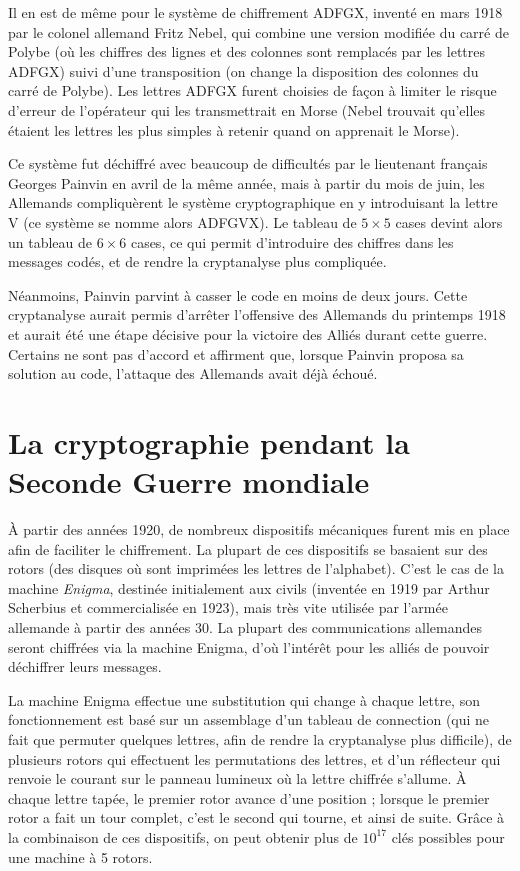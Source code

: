 Il en est de même pour le système de chiffrement ADFGX, inventé en
mars 1918 par le colonel allemand Fritz %
Nebel, qui combine une version modifiée
du carré de Polybe (où les chiffres des
lignes et des colonnes sont remplacés par les lettres ADFGX) suivi d'une
transposition (on change la disposition
des colonnes du carré de Polybe). Les lettres ADFGX furent choisies de
façon à limiter le risque d'erreur de l'opérateur qui les
transmettrait en Morse (Nebel trouvait qu'elles étaient les lettres
les plus simples à retenir quand on apprenait le Morse).

Ce système fut déchiffré avec beaucoup de difficultés par le
lieutenant français Georges Painvin en avril de la même année, mais à
partir du mois de juin, les Allemands compliquèrent le système
cryptographique en y introduisant la lettre V (ce système se nomme
alors ADFGVX). Le tableau de $5\times 5$ cases devint alors un tableau
de $6\times 6$ cases, ce qui permit d'introduire des chiffres dans
les messages codés, et de rendre la cryptanalyse plus
compliquée.

Néanmoins, Painvin parvint à casser le code en moins de
deux jours. Cette cryptanalyse aurait permis d'arrêter l'offensive
des Allemands du printemps 1918 et aurait été une étape décisive pour
la victoire des Alliés durant cette guerre. Certains
ne sont pas d'accord et affirment que, lorsque Painvin proposa
sa solution au code, l'attaque des Allemands avait déjà échoué. 
\section{La cryptographie pendant la Seconde Guerre mondiale}
À partir des années 1920, de nombreux dispositifs mécaniques
furent mis
en place afin de faciliter le chiffrement. La plupart de ces
dispositifs se basaient sur des rotors (des disques où sont imprimées
les lettres de l'alphabet). C'est le cas de la machine \emph{Enigma},
destinée initialement aux civils (inventée en 1919 par Arthur
Scherbius et commercialisée en 1923), mais très vite utilisée par
l'armée allemande à partir des années 30. La plupart des
communications allemandes seront chiffrées via la machine Enigma, d'où
l'intérêt pour les alliés de pouvoir déchiffrer leurs messages.

La machine Enigma effectue une substitution qui change à chaque
lettre, son fonctionnement est basé sur un assemblage d'un tableau de
connection (qui ne fait que permuter quelques lettres, afin de rendre
la cryptanalyse plus difficile), de plusieurs rotors qui effectuent
les permutations des lettres, et d'un réflecteur qui renvoie le courant
sur le panneau lumineux où la lettre chiffrée s'allume. À chaque
lettre tapée, le premier rotor avance d'une position ; lorsque le
premier rotor a fait un tour complet, c'est le second qui tourne, et
ainsi de suite. Grâce à la combinaison de ces dispositifs, on peut
obtenir plus de $10^{17}$ clés possibles pour une machine à 5 rotors.

